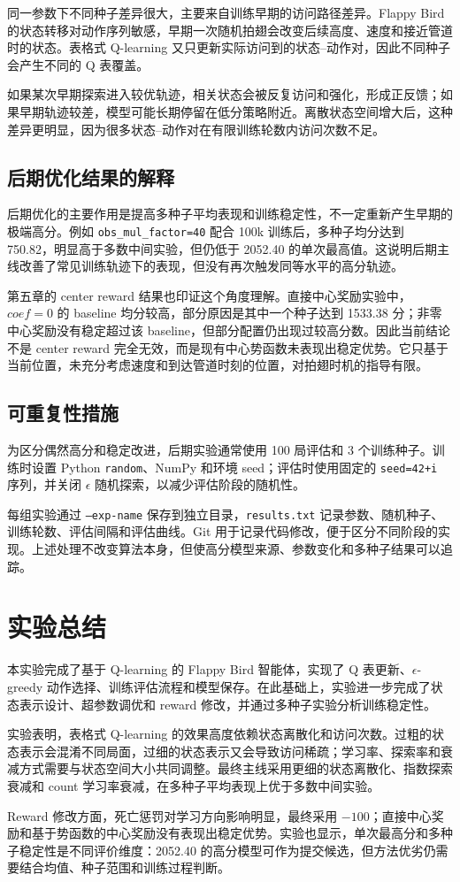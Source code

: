 \documentclass{zjureport}
\begin{document}
同一参数下不同种子差异很大，主要来自训练早期的访问路径差异。Flappy Bird 的状态转移对动作序列敏感，早期一次随机拍翅会改变后续高度、速度和接近管道时的状态。表格式 Q-learning 又只更新实际访问到的状态--动作对，因此不同种子会产生不同的 Q 表覆盖。

如果某次早期探索进入较优轨迹，相关状态会被反复访问和强化，形成正反馈；如果早期轨迹较差，模型可能长期停留在低分策略附近。离散状态空间增大后，这种差异更明显，因为很多状态--动作对在有限训练轮数内访问次数不足。

\subsection{后期优化结果的解释}

后期优化的主要作用是提高多种子平均表现和训练稳定性，不一定重新产生早期的极端高分。例如 \texttt{obs\_mul\_factor=40} 配合 100k 训练后，多种子均分达到 750.82，明显高于多数中间实验，但仍低于 2052.40 的单次最高值。这说明后期主线改善了常见训练轨迹下的表现，但没有再次触发同等水平的高分轨迹。

第五章的 center reward 结果也印证这个角度理解。直接中心奖励实验中，$coef=0$ 的 baseline 均分较高，部分原因是其中一个种子达到 1533.38 分；非零中心奖励没有稳定超过该 baseline，但部分配置仍出现过较高分数。因此当前结论不是 center reward 完全无效，而是现有中心势函数未表现出稳定优势。它只基于当前位置，未充分考虑速度和到达管道时刻的位置，对拍翅时机的指导有限。

\subsection{可重复性措施}

为区分偶然高分和稳定改进，后期实验通常使用 100 局评估和 3 个训练种子。训练时设置 Python \texttt{random}、NumPy 和环境 seed；评估时使用固定的 \texttt{seed=42+i} 序列，并关闭 $\epsilon$ 随机探索，以减少评估阶段的随机性。

每组实验通过 \texttt{--exp-name} 保存到独立目录，\texttt{results.txt} 记录参数、随机种子、训练轮数、评估间隔和评估曲线。Git 用于记录代码修改，便于区分不同阶段的实现。上述处理不改变算法本身，但使高分模型来源、参数变化和多种子结果可以追踪。

\clearpage

\section{实验总结}

本实验完成了基于 Q-learning 的 Flappy Bird 智能体，实现了 Q 表更新、$\epsilon$-greedy 动作选择、训练评估流程和模型保存。在此基础上，实验进一步完成了状态表示设计、超参数调优和 reward 修改，并通过多种子实验分析训练稳定性。

实验表明，表格式 Q-learning 的效果高度依赖状态离散化和访问次数。过粗的状态表示会混淆不同局面，过细的状态表示又会导致访问稀疏；学习率、探索率和衰减方式需要与状态空间大小共同调整。最终主线采用更细的状态离散化、指数探索衰减和 count 学习率衰减，在多种子平均表现上优于多数中间实验。

Reward 修改方面，死亡惩罚对学习方向影响明显，最终采用 $-100$；直接中心奖励和基于势函数的中心奖励没有表现出稳定优势。实验也显示，单次最高分和多种子稳定性是不同评价维度：2052.40 的高分模型可作为提交候选，但方法优劣仍需要结合均值、种子范围和训练过程判断。

\clearpage
\end{document}
